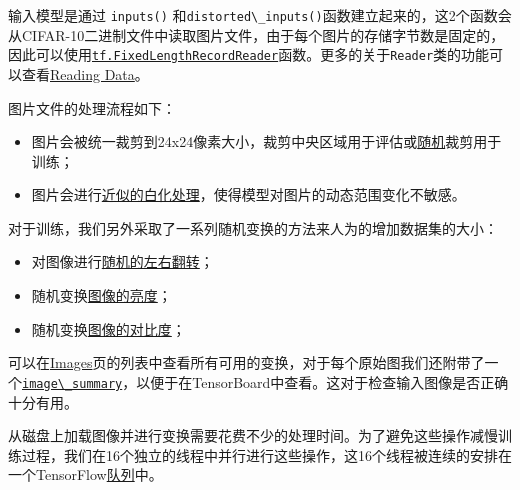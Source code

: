 输入模型是通过 \lstinline{inputs()}
和\lstinline{distorted\_inputs()}函数建立起来的，这2个函数会从CIFAR-10二进制文件中读取图片文件，由于每个图片的存储字节数是固定的，因此可以使用\href{https://github.com/jikexueyuanwiki/tensorflow-zh/blob/master/SOURCE/api_docs/python/io_ops.md\#FixedLengthRecordReader}{\lstinline{tf.FixedLengthRecordReader}}函数。更多的关于\lstinline{Reader}类的功能可以查看\href{https://github.com/jikexueyuanwiki/tensorflow-zh/blob/master/SOURCE/how_tos/reading_data/index.md\#reading-from-files}{Reading
Data}。

图片文件的处理流程如下：

\begin{itemize}
\tightlist
\item
  图片会被统一裁剪到24x24像素大小，裁剪中央区域用于评估或\href{https://github.com/jikexueyuanwiki/tensorflow-zh/blob/master/SOURCE/api_docs/python/image.md\#random_crop}{随机}裁剪用于训练；
\item
  图片会进行\href{https://github.com/jikexueyuanwiki/tensorflow-zh/blob/master/SOURCE/api_docs/python/image.md\#per_image_whitening}{近似的白化处理}，使得模型对图片的动态范围变化不敏感。
\end{itemize}

对于训练，我们另外采取了一系列随机变换的方法来人为的增加数据集的大小：

\begin{itemize}
\tightlist
\item
  对图像进行\href{https://github.com/jikexueyuanwiki/tensorflow-zh/blob/master/SOURCE/api_docs/python/image.md\#random_flip_left_right}{随机的左右翻转}；
\item
  随机变换\href{https://github.com/jikexueyuanwiki/tensorflow-zh/blob/master/SOURCE/api_docs/python/image.md\#random_brightness}{图像的亮度}；
\item
  随机变换\href{https://github.com/jikexueyuanwiki/tensorflow-zh/blob/master/SOURCE/api_docs/python/image.md\#tf_image_random_contrast}{图像的对比度}；
\end{itemize}

可以在\href{https://github.com/jikexueyuanwiki/tensorflow-zh/blob/master/SOURCE/api_docs/python/image.md}{Images}页的列表中查看所有可用的变换，对于每个原始图我们还附带了一个\href{https://github.com/jikexueyuanwiki/tensorflow-zh/blob/master/SOURCE/api_docs/python/train.md\#image_summary}{\lstinline{image\_summary}}，以便于在TensorBoard中查看。这对于检查输入图像是否正确十分有用。

从磁盘上加载图像并进行变换需要花费不少的处理时间。为了避免这些操作减慢训练过程，我们在16个独立的线程中并行进行这些操作，这16个线程被连续的安排在一个TensorFlow\href{https://github.com/jikexueyuanwiki/tensorflow-zh/blob/master/SOURCE/api_docs/python/io_ops.md\#shuffle_batch}{队列}中。

